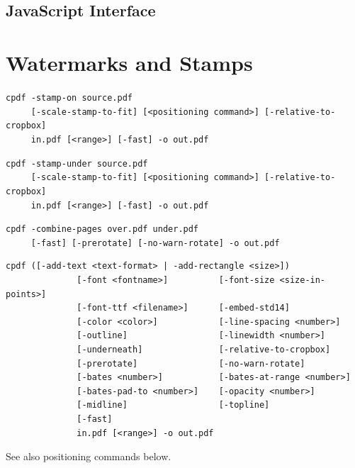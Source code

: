\documentclass{book}
\begin{document}
\begin{jscpdflib}
\clearpage
\section*{JavaScript Interface}
\begin{small}\tt

\end{small}
\end{jscpdflib}

\chapter{Watermarks and Stamps}\label{chap:8}
\label{stamps}
  \begin{framed}
  \noindent\small\verb!cpdf -stamp-on source.pdf!\\
  \noindent\small\verb!     [-scale-stamp-to-fit] [<positioning command>] [-relative-to-cropbox] !\\
  \noindent\small\verb!     in.pdf [<range>] [-fast] -o out.pdf!
  
  \vspace{1.5mm}
  \noindent\small\verb!cpdf -stamp-under source.pdf!\\
  \noindent\small\verb!     [-scale-stamp-to-fit] [<positioning command>] [-relative-to-cropbox]!\\
  \noindent\small\verb!     in.pdf [<range>] [-fast] -o out.pdf!

  \vspace{1.5mm}
  \noindent\small\verb!cpdf -combine-pages over.pdf under.pdf!\\
  \noindent\small\verb!     [-fast] [-prerotate] [-no-warn-rotate] -o out.pdf!

  \vspace{1.5mm}
  \noindent\small\begin{verbatim}cpdf ([-add-text <text-format> | -add-rectangle <size>])
              [-font <fontname>]          [-font-size <size-in-points>]
              [-font-ttf <filename>]      [-embed-std14]
              [-color <color>]            [-line-spacing <number>]
              [-outline]                  [-linewidth <number>]
              [-underneath]               [-relative-to-cropbox]
              [-prerotate]                [-no-warn-rotate]
              [-bates <number>]           [-bates-at-range <number>]
              [-bates-pad-to <number>]    [-opacity <number>]
              [-midline]                  [-topline]
              [-fast]
              in.pdf [<range>] -o out.pdf\end{verbatim}
  \noindent See also positioning commands below.


\end{framed}
\end{document}

